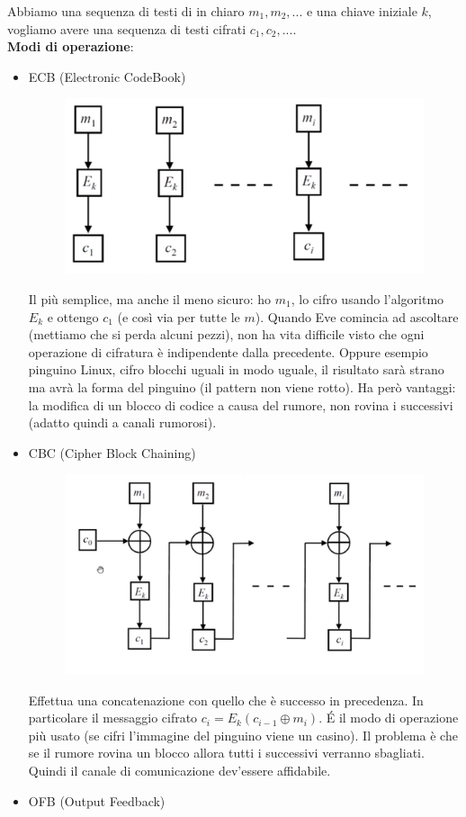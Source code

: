 \begin{itemize}
Abbiamo una sequenza di testi di in chiaro $m_1, m_2, ...$ e una chiave iniziale $k$, vogliamo avere una sequenza di testi cifrati $c_1, c_2,...$.\\
\textbf{Modi di operazione}: 
\begin{itemize}
	\item ECB (Electronic CodeBook)\\
	\begin{figure}[h]
		\centering
		\includegraphics[width=0.5\linewidth]{immagini/img38}
	\end{figure}
	Il più semplice, ma anche il meno sicuro: ho $m_1$, lo cifro usando l'algoritmo $E_k$ e ottengo $c_1$ (e così via per tutte le $m$). Quando Eve comincia ad ascoltare (mettiamo che si perda alcuni pezzi), non ha vita difficile visto che ogni operazione di cifratura è indipendente dalla precedente. Oppure esempio pinguino Linux, cifro blocchi uguali in modo uguale, il risultato sarà strano ma avrà la forma del pinguino (il pattern non viene rotto). Ha però vantaggi: la modifica di un blocco di codice a causa del rumore, non rovina i successivi (adatto quindi a canali rumorosi).
	\item CBC (Cipher Block Chaining)\\
	\begin{figure}[h]
		\centering
		\includegraphics[width=0.5\linewidth]{immagini/img37}
	\end{figure}
Effettua una concatenazione con quello che è successo in precedenza. In particolare il messaggio cifrato $c_i = E_k(c_{i-1} \oplus m_i)$.
\'E il modo di operazione più usato (se cifri l'immagine del pinguino viene un casino). Il problema è che se il rumore rovina un blocco allora tutti i successivi verranno sbagliati. Quindi il canale di comunicazione dev'essere affidabile.
\item OFB (Output Feedback)\\

\end{itemize}
\end{itemize}
